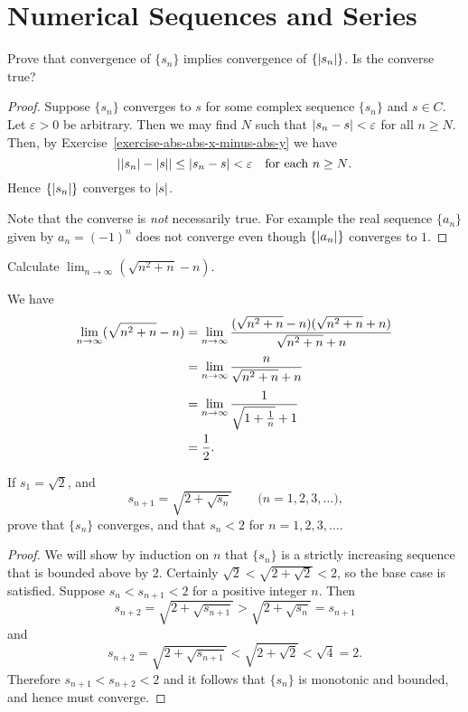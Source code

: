 \chapter{Numerical Sequences and Series}

 Prove that convergence of $\{s_n\}$ implies convergence of
$\{\lvert{s_n}\rvert\}$. Is the converse true?
\begin{proof}
  Suppose $\{s_n\}$ converges to $s$ for some complex sequence
  $\{s_n\}$ and $s\in C$. Let $\varepsilon > 0$ be arbitrary. Then we
  may find $N$ such that $\lvert{s_n - s}\rvert < \varepsilon$ for all
  $n\geq N$. Then, by Exercise~\ref{exercise-abs-abs-x-minus-abs-y} we
  have
  \begin{equation*}
    \lvert{\lvert{s_n}\rvert - \lvert{s}\rvert}\rvert \leq \lvert{s_n - s}\rvert < \varepsilon
    \quad\text{for each $n\geq N$.}
  \end{equation*}
  Hence $\{\lvert{s_n}\rvert\}$ converges to $\lvert{s}\rvert$.

  Note that the converse is {\em not} necessarily true. For example
  the real sequence $\{a_n\}$ given by $a_n = (-1)^n$ does not
  converge even though $\{\lvert{a_n}\rvert\}$ converges to $1$.
\end{proof}

 Calculate $\displaystyle\lim_{n\to\infty}(\sqrt{n^2+n}-n)$.
\begin{solution}
  We have
  \begin{align*}
    \lim_{n\to\infty}(\sqrt{n^2+n}-n)
    &= \lim_{n\to\infty}\frac{(\sqrt{n^2+n}-n)(\sqrt{n^2+n}+n)}
      {\sqrt{n^2+n}+n} \\[3pt]
    &= \lim_{n\to\infty}\frac{n}{\sqrt{n^2+n}+n} \\[3pt]
    &= \lim_{n\to\infty}\frac1{\sqrt{1+\frac{1}n}+1} \\
    &= \frac12. \qedhere
  \end{align*}
\end{solution}

 If $s_1 = \sqrt2$, and
\begin{equation*}
  s_{n+1} = \sqrt{2 + \sqrt{s_n}}
  \qquad\text{($n=1,2,3,\dots$),}
\end{equation*}
prove that $\{s_n\}$ converges, and that $s_n<2$ for
$n = 1,2,3,\dots$.
\begin{proof}
  We will show by induction on $n$ that $\{s_n\}$ is a strictly
  increasing sequence that is bounded above by $2$. Certainly
  $\sqrt2 < \sqrt{2 + \sqrt2} < 2$, so the base case is
  satisfied. Suppose $s_n < s_{n+1} < 2$ for a positive integer
  $n$. Then
  \begin{equation*}
    s_{n+2} = \sqrt{2 + \sqrt{s_{n+1}}} > \sqrt{2 + \sqrt{s_n}} = s_{n+1}
  \end{equation*}
  and
  \begin{equation*}
    s_{n+2} = \sqrt{2 + \sqrt{s_{n+1}}}
    < \sqrt{2 + \sqrt{2}} < \sqrt{4} = 2.
  \end{equation*}
  Therefore $s_{n+1} < s_{n+2} < 2$ and it follows that $\{s_n\}$ is
  monotonic and bounded, and hence must converge.
\end{proof}


